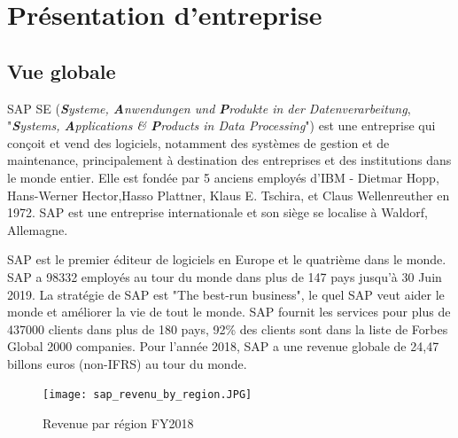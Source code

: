 
\section{Présentation d'entreprise}

\subsection{Vue globale}
    \par SAP SE (\textit{\textbf{S}ysteme, \textbf{A}nwendungen und \textbf{P}rodukte in der Datenverarbeitung}, "\textit{\textbf{S}ystems, \textbf{A}pplications \& \textbf{P}roducts in Data Processing}") est une entreprise qui conçoit et vend des logiciels, notamment des systèmes de gestion et de maintenance, principalement à destination des entreprises et des institutions dans le monde entier. Elle est fondée par 5 anciens employés d’IBM - Dietmar Hopp, Hans-Werner Hector,Hasso Plattner, Klaus E. Tschira, et Claus Wellenreuther en 1972. SAP est une entreprise internationale et son siège se localise à Waldorf, Allemagne.
    
    \par \cite{SAP_Corporate_Fact_Sheet} SAP est le premier éditeur de logiciels en Europe et le quatrième dans le monde. SAP a 98332 employés au tour du monde dans plus de 147 pays jusqu'à 30 Juin 2019. La stratégie de SAP est "The best-run business", le quel SAP veut aider le monde et améliorer la vie de tout le monde. SAP fournit les services pour plus de 437000 clients dans plus de 180 pays, 92\% des clients sont dans la liste de Forbes Global 2000 companies. Pour l'année 2018, SAP a une revenue globale de 24,47 billons euros (non-IFRS) au tour du monde.
    \begin{figure}[H]
        \flushleft
        \texttt{[image: sap\_revenu\_by\_region.JPG]}
        \caption{Revenue par région FY2018}
        \label{fig:revenue_by_region2018_label}
    \end{figure}
    
